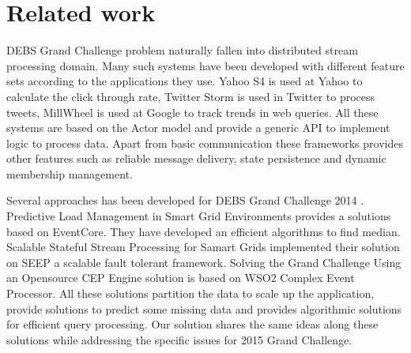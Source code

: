\section{Related work}
DEBS Grand Challenge problem naturally fallen into distributed stream processing domain. Many such systems have been developed with different feature sets according to the applications they use. Yahoo S4 \cite{neumeyer2010s4} is used at Yahoo to calculate the click through rate, Twitter Storm \cite{toshniwal2014storm} is used in Twitter to process tweets, MillWheel \cite{akidau2013millwheel} is used at Google to track trends in web queries. All these systems are based on the Actor model \cite{agha1985actors} and provide a generic API to implement logic to process data. Apart from basic communication these frameworks provides other features such as reliable message delivery, state persistence and dynamic membership management. 

Several approaches has been developed for DEBS Grand Challenge 2014 \cite{jerzak2014debs}. Predictive Load Management in Smart Grid Environments \cite{mutschler2014predictive} provides a solutions based on EventCore. They have developed an efficient algorithms to find median. Scalable Stateful Stream Processing for Samart Grids \cite{fernandez2014scalable} implemented their solution on SEEP \cite{castro2013integrating} a scalable fault tolerant framework. Solving the Grand Challenge Using an Opensource CEP Engine \cite{perera2014solving} solution is based on WSO2 Complex Event Processor. All these solutions partition the data to scale up the application, provide solutions to predict some missing data and provides algorithmic solutions for efficient query processing. Our solution shares the same ideas along these solutions while addressing the specific issues for 2015 Grand Challenge.
